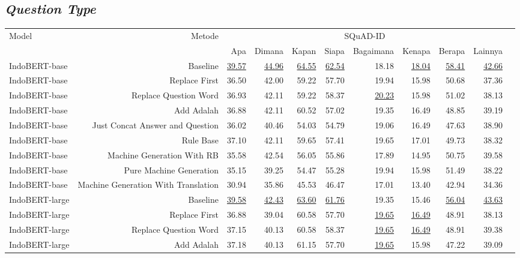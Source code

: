 \subsection*{\emph{Question Type}}
\begin{table}[H]\centering
\tiny
\begin{tabular}{lrrrrrrrrrr}\toprule
\multirow{2}{*}{Model} &\multirow{2}{*}{Metode} &\multicolumn{8}{c}{SQuAD-ID} \\\cmidrule{3-10}
& &Apa &Dimana &Kapan &Siapa &Bagaimana &Kenapa &Berapa &Lainnya \\\midrule
IndoBERT-base &Baseline &\underline{39.57} &\underline{44.96} &\underline{64.55} &\underline{62.54} &18.18 &\underline{18.04} &\underline{58.41} &\underline{42.66} \\
IndoBERT-base &Replace First &36.50 &42.00 &59.22 &57.70 &19.94 &15.98 &50.68 &37.36 \\
IndoBERT-base &Replace Question Word &36.93 &42.11 &59.22 &58.37 &\underline{20.23} &15.98 &51.02 &38.13 \\
IndoBERT-base &Add Adalah &36.88 &42.11 &60.52 &57.02 &19.35 &16.49 &48.85 &39.19 \\
IndoBERT-base &Just Concat Answer and Question &36.02 &40.46 &54.03 &54.79 &19.06 &16.49 &47.63 &38.90 \\
IndoBERT-base &Rule Base &37.10 &42.11 &59.65 &57.41 &19.65 &17.01 &49.73 &38.32 \\
IndoBERT-base &Machine Generation With RB &35.58 &42.54 &56.05 &55.86 &17.89 &14.95 &50.75 &39.58 \\
IndoBERT-base &Pure Machine Generation &35.15 &39.25 &54.47 &55.28 &19.94 &15.98 &51.49 &38.22 \\
IndoBERT-base &Machine Generation With Translation &30.94 &35.86 &45.53 &46.47 &17.01 &13.40 &42.94 &34.36 \\
\hline
IndoBERT-large &Baseline &\underline{39.58} &\underline{42.43} &\underline{63.60} &\underline{61.76} &19.35 &15.46 &\underline{56.04} &\underline{43.63} \\
IndoBERT-large &Replace First &36.88 &39.04 &60.58 &57.70 &\underline{19.65} &\underline{16.49} &48.91 &38.13 \\
IndoBERT-large &Replace Question Word &37.15 &40.13 &60.58 &58.37 &\underline{19.65} &\underline{16.49} &48.91 &39.38 \\
IndoBERT-large &Add Adalah &37.18 &40.13 &61.15 &57.70 &\underline{19.65} &15.98 &47.22 &39.09 \\

\end{tabular}
\end{table}
